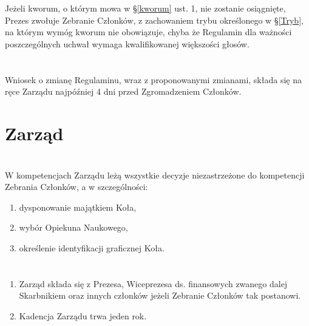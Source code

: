\documentclass[a4paper]{article}
\begin{document}
\section{}
Jeżeli kworum, o którym mowa w \S \ref{kworum} ust. 1, nie zostanie osiągnięte, Prezes zwołuje Zebranie Członków, z zachowaniem trybu określonego w \S \ref{Tryb}, na którym wymóg kworum nie obowiązuje, chyba że Regulamin dla ważności poszczególnych uchwał wymaga kwalifikowanej większości głosów. 

\section{}
Wniosek o zmianę Regulaminu, wraz z proponowanymi zmianami, składa się na ręce Zarządu najpóźniej 4 dni przed Zgromadzeniem Członków.

\section*{Zarząd~~~}
\section{}
W kompetencjach Zarządu leżą wszystkie decyzje niezastrzeżone do kompetencji Zebrania Członków, a w szczególności:
\begin{enumerate}[label=\alph*)]
\item dysponowanie majątkiem Koła,
\item wybór Opiekuna Naukowego,
\item określenie identyfikacji graficznej Koła.
\end{enumerate}

\section{}
\begin{enumerate}
\item Zarząd składa się z Prezesa, Wiceprezesa ds. finansowych zwanego dalej Skarbnikiem oraz innych członków jeżeli Zebranie Członków tak postanowi.
\item Kadencja Zarządu trwa jeden rok.
\end{enumerate}
\end{document}
